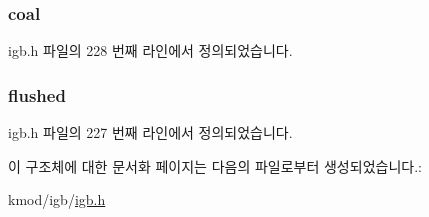 \subsubsection[{\texorpdfstring{coal}{coal}}]{ coal}\hypertarget{structigb__lro__stats_a745689cb434a6cbf4e4da6ab35a61b89}{}\label{structigb__lro__stats_a745689cb434a6cbf4e4da6ab35a61b89}


igb.\+h 파일의 228 번째 라인에서 정의되었습니다.

\subsubsection[{\texorpdfstring{flushed}{flushed}}]{ flushed}\hypertarget{structigb__lro__stats_ac23518f6c232ca9567d2ab6c6ebd079a}{}\label{structigb__lro__stats_ac23518f6c232ca9567d2ab6c6ebd079a}


igb.\+h 파일의 227 번째 라인에서 정의되었습니다.



이 구조체에 대한 문서화 페이지는 다음의 파일로부터 생성되었습니다.\+:\begin{DoxyCompactItemize}
\item 
kmod/igb/\hyperlink{kmod_2igb_2igb_8h}{igb.\+h}\end{DoxyCompactItemize}
